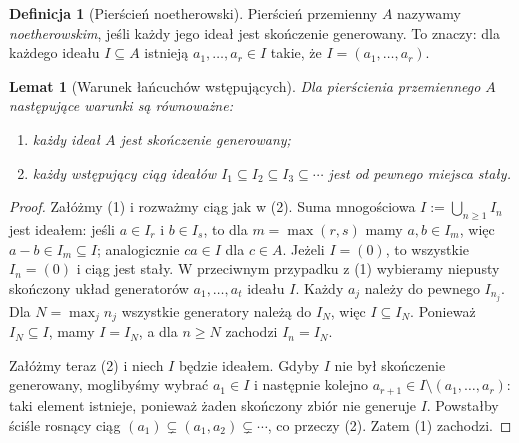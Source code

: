 \documentclass[11pt,a4paper,openany]{report}
\numberwithin{equation}{section}
\theoremstyle{plain}
\newtheorem{lemat}[twierdzenie]{Lemat}
\theoremstyle{definition}
\newtheorem{definicja}[twierdzenie]{Definicja}
\theoremstyle{remark}
\begin{document}
\begin{definicja}[Pierścień noetherowski]
Pierścień przemienny $A$ nazywamy \emph{noetherowskim}, jeśli każdy
jego ideał jest skończenie generowany.
To znaczy: dla każdego ideału $I\subseteq A$ istnieją
$a_1,\dots,a_r\in I$ takie, że $I=(a_1,\dots,a_r)$.
\end{definicja}

\begin{lemat}[Warunek łańcuchów wstępujących]
\label{lem:acc}
Dla pierścienia przemiennego $A$ następujące warunki są równoważne:
\begin{enumerate}[label=\arabic*)]
\item każdy ideał $A$ jest skończenie generowany;
\item każdy wstępujący ciąg ideałów
$I_1\subseteq I_2\subseteq I_3\subseteq\cdots$
jest od pewnego miejsca stały.
\end{enumerate}
\end{lemat}
\begin{proof}
Załóżmy (1) i rozważmy ciąg jak w (2).
Suma mnogościowa $I:=\bigcup_{n\ge1}I_n$ jest ideałem:
jeśli $a\in I_r$ i $b\in I_s$, to dla $m=\max(r,s)$
mamy $a,b\in I_m$, więc $a-b\in I_m\subseteq I$;
analogicznie $ca\in I$ dla $c\in A$.
Jeżeli $I=(0)$, to wszystkie $I_n=(0)$ i ciąg jest stały.
W przeciwnym przypadku z (1) wybieramy niepusty skończony
układ generatorów $a_1,\dots,a_t$ ideału $I$.
Każdy $a_j$ należy do pewnego
$I_{n_j}$. Dla $N=\max_j n_j$ wszystkie generatory należą
do $I_N$, więc $I\subseteq I_N$. Ponieważ $I_N\subseteq I$,
mamy $I=I_N$, a dla $n\ge N$ zachodzi $I_n=I_N$.

Załóżmy teraz (2) i niech $I$ będzie ideałem.
Gdyby $I$ nie był skończenie generowany, moglibyśmy wybrać
$a_1\in I$ i następnie kolejno $a_{r+1}\in I\setminus(a_1,\dots,a_r)$: taki element istnieje, ponieważ żaden
skończony zbiór nie generuje $I$.
Powstałby ściśle rosnący ciąg
$(a_1)\subsetneq(a_1,a_2)\subsetneq\cdots$,
co przeczy (2). Zatem (1) zachodzi.
\end{proof}
\end{document}
